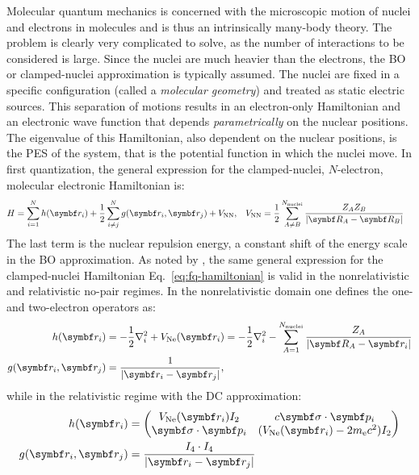 Molecular quantum mechanics is concerned with the microscopic motion of
nuclei and electrons in molecules and is thus an intrinsically many-body
theory. The problem is clearly very complicated to solve, as the number of
interactions to be considered is large.
Since the nuclei are much heavier than the electrons, the \gls{BO} or
clamped-nuclei approximation is typically assumed. The nuclei are fixed
in a specific configuration (called a \emph{molecular geometry}) and
treated as static electric sources.\autocite{Born1927-ce}
This separation of motions results in an electron-only Hamiltonian and
an electronic wave function that depends \emph{parametrically} on the
nuclear positions. The eigenvalue of this Hamiltonian, also dependent on
the nuclear positions, is the \gls{PES} of the system, that is the
potential function in which the nuclei move.\autocite{Szabo1989-vl,
McWeeny1992-oj}
In first quantization, the general expression for the clamped-nuclei,
$N$-electron, molecular electronic Hamiltonian is:
\begin{alignat}{2}\label{eq:fq-hamiltonian}
  H = \sum_{i=1}^N h(\vect{r}_i)
  + \frac{1}{2}\sum_{i\neq j}^N g(\vect{r}_i, \vect{r}_j)
  + V_\mathrm{NN},
  \quad&
  V_\mathrm{NN} =
  \frac{1}{2}\sum_{A \neq B}^{N_\mathrm{nuclei}}\frac{Z_A Z_B}{|\vect{R}_A - \vect{R}_B|}
\end{alignat}
The last term is the nuclear repulsion energy, a constant shift of the
energy scale in the \acrshort{BO} approximation.
As noted by \citeauthor{Saue2011-qg}, the same general expression for
the clamped-nuclei Hamiltonian Eq.~\eqref{eq:fq-hamiltonian} is valid in
the nonrelativistic and relativistic no-pair
regimes.\autocite{Sucher1980-vf, Saue2011-qg}
In the nonrelativistic domain one defines the one- and two-electron
operators as:\autocite{Szabo1989-vl, McWeeny1992-oj, Konishi2009-zb}
\begin{subequations}
 \begin{align}
   h(\vect{r}_i) &=
   -\frac{1}{2}\nabla^2_i + V_\mathrm{Ne}(\vect{r}_i)
   = -\frac{1}{2}\nabla^2_i - \sum_{A=1}^{N_\mathrm{nuclei}}\frac{Z_A}{|\vect{R}_A -
   \vect{r}_i|} \label{eq:h} \\
   g(\vect{r}_i, \vect{r}_j) &= \frac{1}{|\vect{r}_i - \vect{r}_j|},
   \label{eq:g-coulomb}
 \end{align}
\end{subequations}
while in the relativistic regime with the \gls{DC}
approximation:\autocite{Dyall2007-tu, Konishi2009-zb, Reiher2014-cp}
\begin{subequations}
 \begin{align}
   h(\vect{r}_i) &=
   \begin{pmatrix}
     V_{\mathrm{Ne}}(\vect{r}_i)I_2 & c \vect{\sigma}\cdot\vect{p}_i \\
     \vect{\sigma}\cdot\vect{p}_i & (V_{\mathrm{Ne}}(\vect{r}_i)-2\si{\electronmass}c^2)I_2
   \end{pmatrix} \label{eq:h-dirac} \\
   g(\vect{r}_i, \vect{r}_j) &= \frac{I_4\cdot I_4}{|\vect{r}_i - \vect{r}_j|}
   \label{eq:g-r-coulomb}
 \end{align}
\end{subequations}
